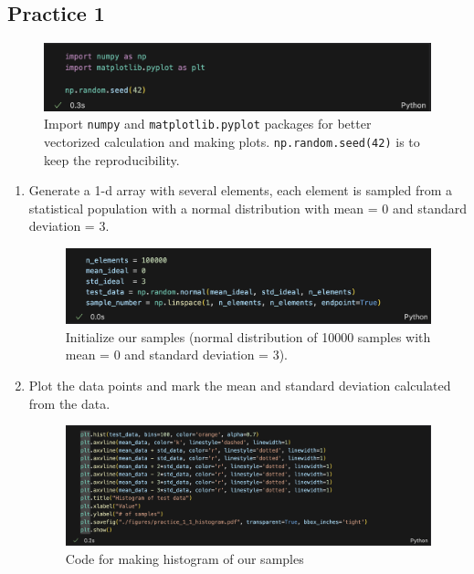 \documentclass[12pt,a4paper]{article}
\begin{document}
\begin{CJK}{UTF8}{bkai}
\subsection{Practice 1}

\begin{figure}[h]
    \centering
    \includegraphics[width=0.9\linewidth]{figures/code/code_1_1.png}
    \caption{Import \texttt{numpy} and \texttt{matplotlib.pyplot} packages for better vectorized calculation and making plots. \texttt{np.random.seed(42)} is to keep the reproducibility.}
    \label{fig:code_1_1}
\end{figure}
\begin{enumerate}
    \item Generate a 1-d array with several elements, each element is sampled from a statistical population with a normal distribution with mean = 0 and standard deviation = 3.
    \begin{figure}[h]
        \centering
        \includegraphics[width=0.9\linewidth]{figures/code/code_1_2.png}
        \caption{Initialize our samples (normal distribution of 10000 samples with mean = 0 and standard deviation = 3).}
        \label{fig:code_1_2}
    \end{figure}
    \item Plot the data points and mark the mean and standard deviation calculated from the data.
    \begin{figure}[h]
        \centering
        \includegraphics[width=0.9\linewidth]{figures/code/code_1_4.png}
        \caption{Code for making histogram of our samples}
        \label{fig:code_1_4}

\end{figure}
\end{enumerate}
\end{CJK}
\end{document}
